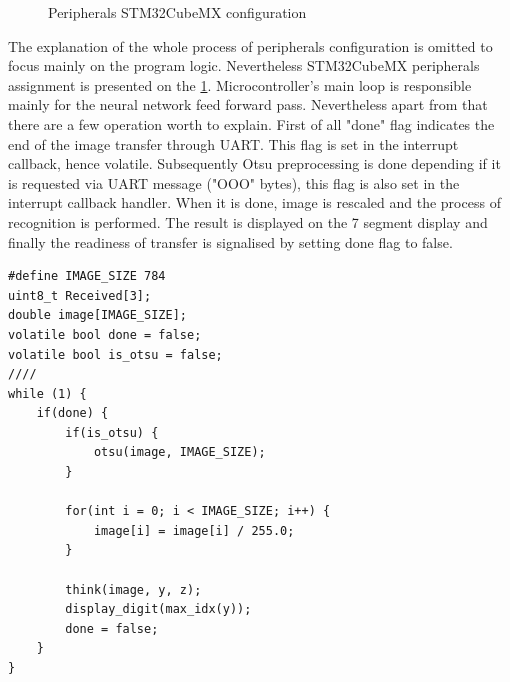 \begin{figure}[H]
	\begin{center}
	\end{center}
	\caption{Peripherals STM32CubeMX configuration}
	\label{fig:cube}
\end{figure}
The explanation of the whole process of peripherals configuration is omitted to focus mainly on the program logic. Nevertheless STM32CubeMX peripherals assignment is presented on the \figurename{} \ref{fig:cube}.
Microcontroller's main loop is responsible mainly for the neural network feed forward pass. Nevertheless apart from that there are a few operation worth to explain. First of all "done" flag indicates the end of the image transfer through UART. This flag is set in the interrupt callback, hence volatile. Subsequently Otsu preprocessing is done depending if it is requested via UART message ("OOO" bytes), this flag is also set in the interrupt callback handler. When it is done, image is rescaled and the process of recognition is performed. The result is displayed on the 7 segment display and finally the readiness of transfer is signalised by setting done flag to false. 
\begin{verbatim}
#define IMAGE_SIZE 784
uint8_t Received[3];
double image[IMAGE_SIZE];
volatile bool done = false;
volatile bool is_otsu = false;
////
while (1) {
    if(done) {
        if(is_otsu) {
            otsu(image, IMAGE_SIZE);
        }
        
        for(int i = 0; i < IMAGE_SIZE; i++) {
            image[i] = image[i] / 255.0;
        }
    
        think(image, y, z);
        display_digit(max_idx(y));
        done = false;
    }
}
\end{verbatim}
